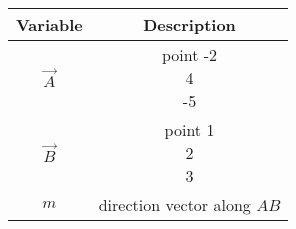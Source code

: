 \begin{tabular}[12pt]{ |c| c|}
    \hline
    \textbf{Variable} & \textbf{Description}\\ 
    \hline
    $\vec{A}$ & point \myvec{-2\\4\\-5}\\
    \hline 
    $\vec{B}$ & point \myvec{1\\2\\3}\\
    \hline
    $m$ & direction vector along $AB$\\
    \hline
    \end{tabular}


